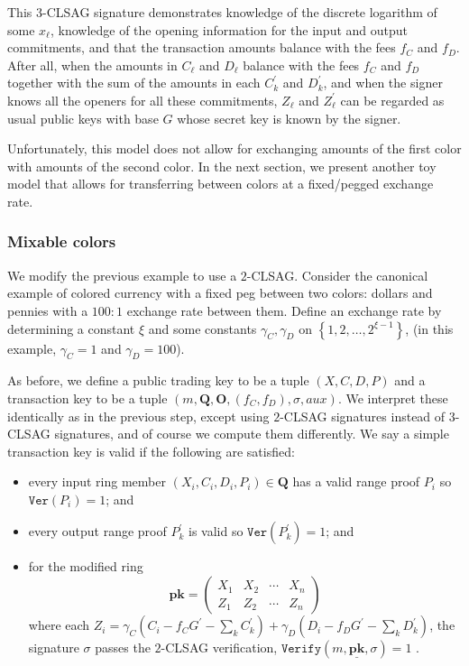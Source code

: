 \documentclass[draft]{llncs} %
\begin{document}
This $3$-CLSAG signature demonstrates knowledge of the discrete logarithm of some $x_\ell$, knowledge of the opening information for the input and output commitments, and that the transaction amounts balance  with the fees $f_C$ and $f_D$.  After all, when the amounts in $C_\ell$ and $D_\ell$ balance with the fees $f_C$ and $f_D$ together with the sum of the amounts in each $C_k^\prime$ and $D_k^\prime$, and when the signer knows all the openers for all these commitments, $Z_\ell$ and $Z_\ell^\prime$ can be regarded as usual public keys with base $G$ whose secret key is known by the signer.

Unfortunately, this model does not allow for exchanging amounts of the first color with amounts of the second color. In the next section, we present another toy model that allows for transferring between colors at a fixed/pegged exchange rate.


\subsubsection{Mixable colors}\label{sec:mixable}
We modify the previous example to use a $2$-CLSAG. Consider the canonical example of colored currency with a fixed peg between two colors: dollars and pennies with a $100:1$ exchange rate between them. Define an exchange rate by determining a constant $\xi$ and some constants $\gamma_C, \gamma_D$ on $\left\{1, 2, \ldots, 2^{\xi - 1}\right\}$, (in this example, $\gamma_C = 1$ and $\gamma_D = 100$).

As before, we define a public trading key to be a tuple $(X, C, D, P)$ and a transaction key to be a tuple $(m, \textbf{Q}, \textbf{O}, (f_C, f_D), \sigma, \textit{aux})$. We interpret these identically as in the previous step, except using $2$-CLSAG signatures instead of $3$-CLSAG signatures, and of course we compute them differently. We say a simple transaction key is valid if the following are satisfied:
\begin{itemize}
\item every input ring member $(X_i, C_i, D_i, P_i) \in \textbf{Q}$ has a valid range proof $P_i$ so $\texttt{Ver}(P_i) = 1$; and

\item every output range proof $P_k^\prime$ is valid so $\texttt{Ver}(P_k^\prime)=1$; and

\item for the modified ring \[\textbf{pk} = \begin{pmatrix} X_1 & X_2 & \cdots & X_n \\ Z_1 & Z_2 & \cdots & Z_n\end{pmatrix}\] where each $Z_i = \gamma_C (C_i - f_C G^\prime - \sum_k C_k^\prime) + \gamma_D ( D_i - f_D G^\prime - \sum_k D_k^\prime)$, the signature $\sigma$ passes the $2$-CLSAG verification, $\texttt{Verify}(m, \underline{\textbf{pk}}, \sigma) = 1$ .
\end{itemize}
\end{document}

